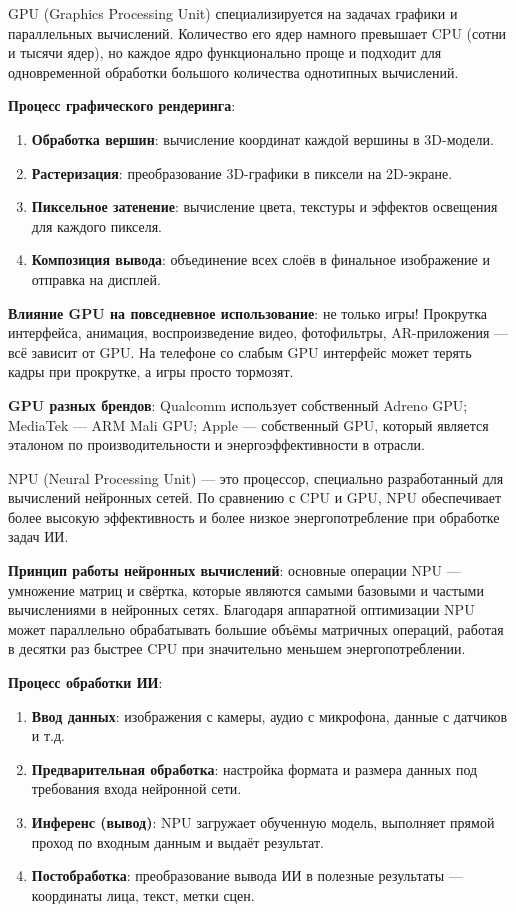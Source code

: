 
GPU (Graphics Processing Unit) специализируется на задачах графики и параллельных вычислений. Количество его ядер намного превышает CPU (сотни и тысячи ядер), но каждое ядро функционально проще и подходит для одновременной обработки большого количества однотипных вычислений.

\textbf{Процесс графического рендеринга}:

\begin{enumerate}
  \item \textbf{Обработка вершин}: вычисление координат каждой вершины в 3D-модели.
  \item \textbf{Растеризация}: преобразование 3D-графики в пиксели на 2D-экране.
  \item \textbf{Пиксельное затенение}: вычисление цвета, текстуры и эффектов освещения для каждого пикселя.
  \item \textbf{Композиция вывода}: объединение всех слоёв в финальное изображение и отправка на дисплей.
\end{enumerate}

\textbf{Влияние GPU на повседневное использование}: не только игры! Прокрутка интерфейса, анимация, воспроизведение видео, фотофильтры, AR-приложения — всё зависит от GPU. На телефоне со слабым GPU интерфейс может терять кадры при прокрутке, а игры просто тормозят.

\textbf{GPU разных брендов}: Qualcomm использует собственный Adreno GPU; MediaTek — ARM Mali GPU; Apple — собственный GPU, который является эталоном по производительности и энергоэффективности в отрасли.


NPU (Neural Processing Unit) — это процессор, специально разработанный для вычислений нейронных сетей. По сравнению с CPU и GPU, NPU обеспечивает более высокую эффективность и более низкое энергопотребление при обработке задач ИИ.

\textbf{Принцип работы нейронных вычислений}: основные операции NPU — умножение матриц и свёртка, которые являются самыми базовыми и частыми вычислениями в нейронных сетях. Благодаря аппаратной оптимизации NPU может параллельно обрабатывать большие объёмы матричных операций, работая в десятки раз быстрее CPU при значительно меньшем энергопотреблении.

\textbf{Процесс обработки ИИ}:

\begin{enumerate}
  \item \textbf{Ввод данных}: изображения с камеры, аудио с микрофона, данные с датчиков и т.д.
  \item \textbf{Предварительная обработка}: настройка формата и размера данных под требования входа нейронной сети.
  \item \textbf{Инференс (вывод)}: NPU загружает обученную модель, выполняет прямой проход по входным данным и выдаёт результат.
  \item \textbf{Постобработка}: преобразование вывода ИИ в полезные результаты — координаты лица, текст, метки сцен.
\end{enumerate}

